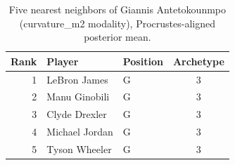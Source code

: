 \begin{table}[htbp]
  \centering\small
  \begin{tabular}{rllc}
    \toprule
    Rank & Player & Position & Archetype \\
    \midrule
    1 & LeBron James & G & 3 \\
    2 & Manu Ginobili & G & 3 \\
    3 & Clyde Drexler & G & 3 \\
    4 & Michael Jordan & G & 3 \\
    5 & Tyson Wheeler & G & 3 \\
    \bottomrule
  \end{tabular}
  \caption{Five nearest neighbors of Giannis Antetokounmpo (curvature_m2 modality), Procrustes-aligned posterior mean.}
  \label{tab:Giannis_Antetokounmpo_neighbors_curvature_m2}
\end{table}

